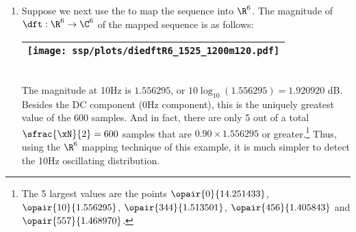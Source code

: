 \begin{example}
\begin{enumerate}
  \item \label{item:nonstat34_R6}
    Suppose we next use the   to map
    the sequence into $\R^6$.
    The magnitude of $\dft:\R^6\to\C^6$ of the mapped sequence is as follows:
    \\\begin{tabular}{|>{\scs}c|}
         \hline
         \texttt{[image: ssp/plots/diedftR6\_1525\_1200m120.pdf]}%
       \\\hline
    \end{tabular}\\
    The magnitude at 10Hz is $1.556295$, or $10\log_{10}(1.556295)=1.920920$ dB.
    Besides the DC component (0Hz component), this is the uniquely greatest value of the 600 samples.
    And in fact, there are only 5 out of a total $\sfrac{\xN}{2}=600$ samples
    that are $0.90\times1.556295$ or greater.\footnote{ 
      The 5 largest values are the points
      $\opair{0}{14.251433}$, $\opair{10}{1.556295}$, $\opair{344}{1.513501}$, $\opair{456}{1.405843}$ and $\opair{557}{1.468970}$.
      } 
    Thus, using the $\R^6$ mapping technique of this example, 
    it is much simpler to detect the 10Hz oscillating distribution.
\end{enumerate}
\end{example}

